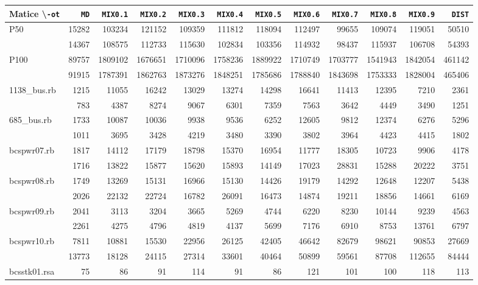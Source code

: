 \documentclass{ctuthesis}
\theoremstyle{plain}
\theoremstyle{definition}
\begin{document}
\bigskip
{\noindent
\scriptsize
  \centering
  \renewcommand{\arraystretch}{1.1}
  \setlength{\tabcolsep}{0.25em}
\begin{tabular}{|l|rrrrrrrrrrr|}
  \hline
  Matice \textbackslash \texttt{-ot}& \texttt{MD} & \texttt{MIX0.1} & \texttt{MIX0.2} & \texttt{MIX0.3} & \texttt{MIX0.4} & \texttt{MIX0.5} & \texttt{MIX0.6} & \texttt{MIX0.7} & \texttt{MIX0.8} & \texttt{MIX0.9} & \texttt{DIST} \\
  \hline
  \multirow{2}{*}{P50}&15282&103234&121152&109359&111812&118094&112497&99655&109074&119051&50510	\\
  &14367&108575&112733&115630&102834&103356&114932&98437&115937&106708&54393	\\
  \hline
  \multirow{2}{*}{P100}&89757&1809102&1676651&1710096&1758236&1889922&1710749&1703777&1541943&1842054&461142	\\
  &91915&1787391&1862763&1873276&1848251&1785686&1788840&1843698&1753333&1828004&465406	\\
  \hline
  \multirow{2}{*}{1138\_bus.rb}&1215&11055&16242&13029&13274&14298&16641&11413&12395&7210&2361	\\
  &783&4387&8274&9067&6301&7359&7563&3642&4449&3490&1251	\\
  \hline
  \multirow{2}{*}{685\_bus.rb}&1733&10087&10036&9938&9536&6252&12605&9812&12374&6276&5296	\\
  &1011&3695&3428&4219&3480&3390&3802&3964&4423&4415&1802	\\
  \hline
  \multirow{2}{*}{bcspwr07.rb}&1817&14112&17179&18798&15370&16954&11777&18305&10723&9906&4178	\\
  &1716&13822&15877&15620&15893&14149&17023&28831&15288&20222&3751	\\
  \hline
  \multirow{2}{*}{bcspwr08.rb}&1749&13269&15131&16966&15130&14426&19179&14292&12648&12207&5438	\\
  &2026&22132&22724&16782&26091&16473&14874&19211&18856&14661&6169	\\
  \hline
  \multirow{2}{*}{bcspwr09.rb}&2041&3113&3204&3665&5269&4744&6220&8230&10144&9239&4563	\\
  &2261&4275&4796&4819&4137&5699&7176&6910&8753&13761&6797	\\
  \hline
  \multirow{2}{*}{bcspwr10.rb}&7811&10881&15530&22956&26125&42405&46642&82679&98621&90853&27669	\\
  &13773&18128&24115&27314&33601&40464&50899&59561&87708&112655&84444	\\
  \hline
  \multirow{2}{*}{bcsstk01.rsa}&75&86&91&114&91&86&121&101&100&118&113	\\

\end{tabular}}
\end{document}
